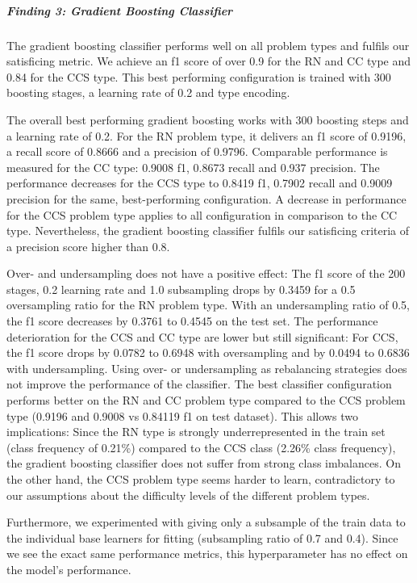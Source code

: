 \subparagraph{Finding 3: Gradient Boosting Classifier}
The gradient boosting classifier performs well on all problem types and fulfils our satisficing  metric. We achieve an f1 score of over 0.9 for the RN and CC type and 0.84 for the CCS type. This best performing configuration is trained with 300 boosting stages, a learning rate of 0.2 and type encoding.

The overall best performing gradient boosting works with 300 boosting steps and a learning rate of 0.2. For the RN problem type, it delivers an f1 score of 0.9196, a recall score of 0.8666 and a precision of 0.9796. Comparable performance is measured for the CC type: 0.9008 f1, 0.8673 recall and 0.937 precision. The performance decreases for the CCS type to 0.8419 f1, 0.7902 recall and 0.9009 precision for the same, best-performing configuration. A decrease in performance for the CCS problem type applies to all configuration in comparison to the CC type. Nevertheless, the gradient boosting classifier fulfils our satisficing criteria of a precision score higher than 0.8.

Over- and undersampling does not have a positive effect: The f1 score of the 200 stages, 0.2 learning rate and 1.0 subsampling drops by 0.3459 for a 0.5 oversampling ratio for the RN problem type. With an undersampling ratio of 0.5, the f1 score decreases by 0.3761 to 0.4545 on the test set. The performance deterioration for the CCS and CC type are lower but still significant: For CCS, the f1 score drops by 0.0782 to 0.6948 with oversampling and by 0.0494 to 0.6836 with undersampling. Using over- or undersampling as rebalancing strategies does not improve the performance of the classifier. The best classifier configuration performs better on the RN and CC problem type compared to the CCS problem type (0.9196 and 0.9008 vs 0.84119 f1 on test dataset). This allows two implications: Since the RN type is strongly underrepresented in the train set (class frequency of 0.21\%) compared to the CCS class (2.26\% class frequency), the gradient boosting classifier does not suffer from strong class imbalances. On the other hand, the CCS problem type seems harder to learn, contradictory to our assumptions about the difficulty levels of the different problem types.

Furthermore, we experimented with giving only a subsample of the train data to the individual base learners for fitting (subsampling ratio of 0.7 and 0.4). Since we see the exact same performance metrics, this hyperparameter has no effect on the model's performance.

